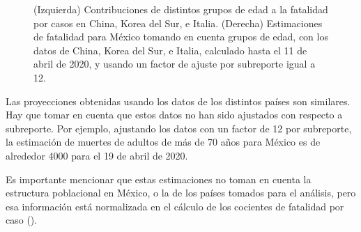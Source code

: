 \begin{figure}[h]
\begin{minipage}{0.5\textwidth}
\end{minipage}
\caption{(Izquierda) Contribuciones de distintos grupos de edad a la fatalidad por casos en China, Korea del Sur, e Italia. (Derecha) Estimaciones de fatalidad para México tomando en cuenta grupos de edad, con los datos de China, Korea del Sur, e Italia, calculado hasta el 11 de abril de 2020, y usando un factor de ajuste por subreporte igual a 12. }\label{fig:estimates}
\end{figure}

Las proyecciones obtenidas usando los datos de los distintos países son similares. Hay que tomar en cuenta que estos datos no han sido ajustados con respecto a subreporte. Por ejemplo, ajustando los datos con un factor de 12 por subreporte, la estimación de  muertes de adultos de más de 70 años para México es  de alrededor 4000 para el 19 de abril de 2020. 


Es importante mencionar que estas estimaciones no toman en cuenta la estructura poblacional en México, o la de los países tomados para el análisis, pero esa información está normalizada en el cálculo de los cocientes de fatalidad por caso (). 





